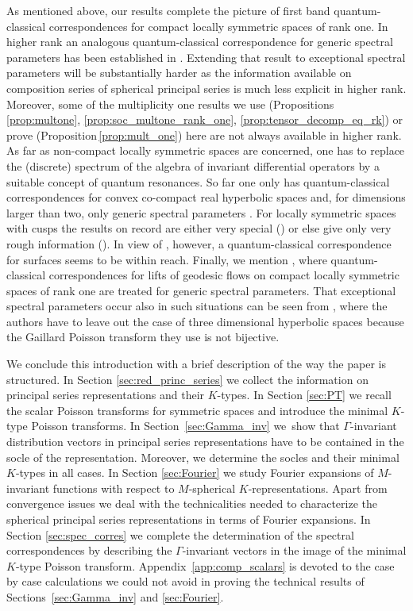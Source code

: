 \documentclass[JEP,XML,SOM,NoFloatCountersInSection,Unicode,published]{cedram}
\theoremstyle{definition}
\begin{document}
As mentioned above, our results complete the picture of first band quantum-classical correspondences for compact locally symmetric spaces of rank one. In higher rank an analogous quantum-classical correspondence for generic spectral parameters has been established in \cite{HWW21}. Extending that result to exceptional spectral para\-me\-ters will be substantially harder as the information available on composition series of spherical principal series is much less explicit in higher rank. Moreover, some of the multiplicity one results we use (Propositions \ref{prop:multone}, \ref{prop:soc_multone_rank_one}, \ref{prop:tensor_decomp_eq_rk}) or prove (Proposition\,\ref{prop:mult_one}) here are not always available in higher rank. As far as non-compact locally symmetric spaces are concerned, one has to replace the (discrete) spectrum of the alge\-bra of invariant differential operators by a suitable concept of quantum resonances. So far one only has quantum-classical correspondences for convex co-compact real hyperbolic spaces and, for dimensions larger than two, only generic spectral parameters \cite{GHWa,Ha20}. For locally symmetric spaces with cusps the results on record are either very special (\eg \cite{LZ01,M06}) or else give only very rough information (\eg \cite{DH05}). In view of \cite{GW17,Poh12}, however, a quantum-classical correspondence for surfaces seems to be within reach. Finally, we mention \cite{KW21}, where quantum-classical correspondences for lifts of geodesic flows on compact locally symmetric spaces of rank one are treated for generic spectral parameters. That excep\-tion\-al spectral parameters occur also in such situations can be seen from \cite{KW20}, where the authors have to leave out the case of three dimensional hyperbolic spaces because the Gaillard Poisson transform they use is not bijective.

We conclude this introduction with a brief description of the way the paper is structured. In Section \ref{sec:red_princ_series} we collect the information on principal series representations and their $K$-types. In Section \ref{sec:PT} we recall the scalar Poisson transforms for symmetric spaces and introduce the minimal $K$-type Poisson transforms. In Section~\ref{sec:Gamma_inv} we~show that $\Gamma$-invariant distribution vectors in principal series representations have to be contained in the socle of the representation. Moreover, we determine the socles and their minimal $K$-types in all cases. In Section \ref{sec:Fourier} we study Fourier expansions of $M$-invariant functions with respect to $M$-spherical $K$-representations. Apart from convergence issues we deal with the technicalities needed to characterize the spherical principal series representations in terms of Fourier expansions. In Section \ref{sec:spec_corres} we complete the determination of the spectral correspondences by describing the $\Gamma$-invariant vectors in the image of the minimal $K$-type Poisson transform. Appendix~\ref{app:comp_scalars} is devoted to the case by case calculations we could not avoid in proving the technical results of Sections~\ref{sec:Gamma_inv} and \ref{sec:Fourier}.
\end{document}
